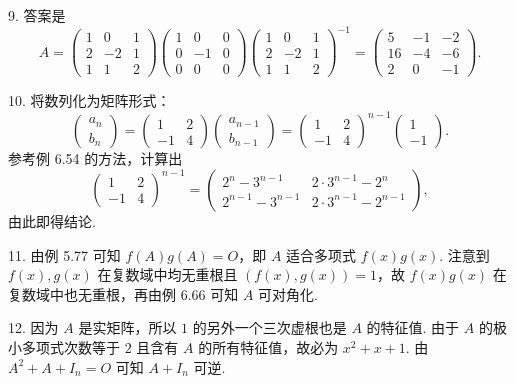 \documentclass[UTF8,12pt,a4paper,fontset=fandol]{ctexart}
\begin{document}
9. 答案是
\[
A=
\begin{pmatrix}1&0&1\\2&-2&1\\1&1&2\end{pmatrix}
\begin{pmatrix}1&0&0\\0&-1&0\\0&0&0\end{pmatrix}
\begin{pmatrix}1&0&1\\2&-2&1\\1&1&2\end{pmatrix}^{-1}
=
\begin{pmatrix}5&-1&-2\\16&-4&-6\\2&0&-1\end{pmatrix}.
\]

10. 将数列化为矩阵形式：
\[
\begin{pmatrix}a_n\\b_n\end{pmatrix}
=
\begin{pmatrix}1&2\\-1&4\end{pmatrix}
\begin{pmatrix}a_{n-1}\\b_{n-1}\end{pmatrix}
=
\begin{pmatrix}1&2\\-1&4\end{pmatrix}^{n-1}
\begin{pmatrix}1\\-1\end{pmatrix}.
\]
参考例 6.54 的方法，计算出
\[
\begin{pmatrix}1&2\\-1&4\end{pmatrix}^{n-1}
=
\begin{pmatrix}
2^n-3^{n-1}&2\cdot 3^{n-1}-2^n\\
2^{n-1}-3^{n-1}&2\cdot 3^{n-1}-2^{n-1}
\end{pmatrix},
\]
由此即得结论.

11. 由例 5.77 可知 $f(A)g(A)=O$，即 $A$ 适合多项式 $f(x)g(x)$. 注意到 $f(x),g(x)$ 在复数域中均无重根且 $(f(x),g(x))=1$，故 $f(x)g(x)$ 在复数域中也无重根，再由例 6.66 可知 $A$ 可对角化.

12. 因为 $A$ 是实矩阵，所以 $1$ 的另外一个三次虚根也是 $A$ 的特征值. 由于 $A$ 的极小多项式次数等于 $2$ 且含有 $A$ 的所有特征值，故必为 $x^2+x+1$. 由 $A^2+A+I_n=O$ 可知 $A+I_n$ 可逆.
\end{document}
